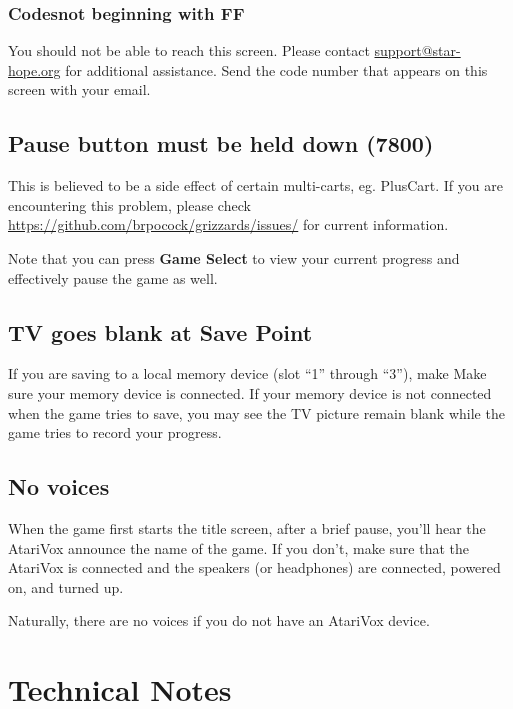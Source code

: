\documentclass[10pt,twocolumn,openany,article]{memoir}
\begin{document}
\else

\subsection{Codes\ifdefined\PLUSCART not beginning with FF\fi}

You  should   not  be  able   to  reach  this  screen.   Please  contact
\href{mailto:support@star-hope.org}{support@star-hope.org}           for
additional assistance. Send the code  number that appears on this screen
with your email.

\section{Pause button must be held down (7800)}

This  is believed  to  be  a side  effect  of  certain multi-carts,  eg.
PlusCart.   If  you   are  encountering   this  problem,   please  check
\href{https://github.com/brpocock/grizzards/issues/182}{https://\-github.com/\-brpocock/\-grizzards/\-issues/}
for current information.

Note  that you  can  press  \textbf{Game Select}  to  view your  current
progress and effectively pause the game as well.

\section{TV goes blank at Save Point}

\ifdefined\PLUSCART
If you are saving to a local memory device (slot ``1'' through ``3''), make
\else
Make
\fi
sure your memory device is  connected. If your memory device is not
connected when the game tries to save, you may see the TV picture remain
blank while the game tries to record your progress.

\section{No voices}

When the game first starts the title screen, after a brief pause, you'll
hear the AtariVox announce the name of the game. If you don't, make sure
that  the AtariVox  is connected  and the  speakers (or  headphones) are
connected, powered on, and turned up.

Naturally, there are no voices if you do not have an AtariVox device.

\fi

\chapter{Technical Notes}
\end{document}
